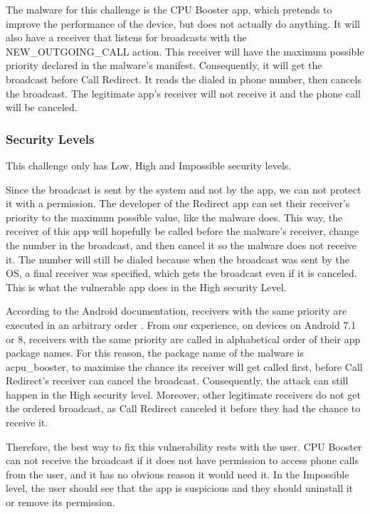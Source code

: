     The malware for this challenge is the CPU Booster app, which pretends to improve the performance of the device, but does not actually do anything. It will also have a receiver that listens for broadcasts with the NEW\_OUTGOING\_CALL action. This receiver will have the maximum possible priority declared in the malware's manifest. Consequently, it will get the broadcast before Call Redirect. It reads the dialed in phone number, then cancels the broadcast. The legitimate app's receiver will not receive it and the phone call will be canceled.
    
    \subsubsection{Security Levels}
        \label{subsubsec:broadcast_theft_dos_security_levels}
        
    This challenge only has Low, High and Impossible security levels.
        
    Since the broadcast is sent by the system and not by the app, we can not protect it with a permission. The developer of the Redirect app can set their receiver's priority to the maximum possible value, like the malware does. This way, the receiver of this app will hopefully be called before the malware's receiver, change the number in the broadcast, and then cancel it so the malware does not receive it. The number will still be dialed because when the broadcast was sent by the OS, a final receiver was specified, which gets the broadcast even if it is canceled. This is what the vulnerable app does in the High security Level.

    According to the Android documentation, receivers with the same priority are executed in an arbitrary order \cite{broadcasts_overview}. From our experience, on devices on Android 7.1 or 8, receivers with the same priority are called in alphabetical order of their app package names. For this reason, the package name of the malware is acpu\_booster, to maximise the chance its receiver will get called first, before Call Redirect's receiver can cancel the broadcast. Consequently, the attack can still happen in the High security level. Moreover, other legitimate receivers do not get the ordered broadcast, as Call Redirect canceled it before they had the chance to receive it.

    Therefore, the best way to fix this vulnerability rests with the user. CPU Booster can not receive the broadcast if it does not have permission to access phone calls from the user, and it has no obvious reason it would need it. In the Impossible level, the user should see that the app is suspicious and they should uninstall it or remove its permission. 
    
